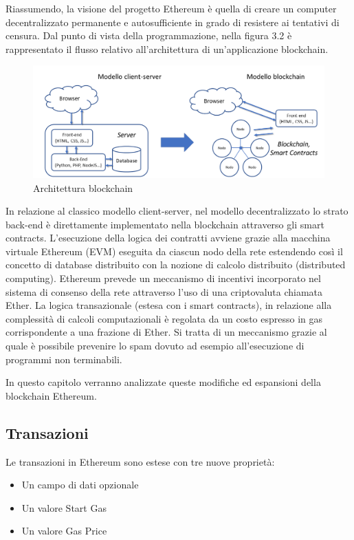 Riassumendo, la visione del progetto Ethereum è quella di creare un computer decentralizzato permanente e autosufficiente in grado di resistere ai tentativi di censura. Dal punto di vista della programmazione, nella figura 3.2 è rappresentato il flusso relativo all’architettura di un’applicazione blockchain.

\begin{figure}[H]
\centering
\includegraphics[width=1\textwidth]{immagini/architetturav1.png}
\caption{Architettura blockchain}
\label{fig:mesh8}
\end{figure}

In relazione al classico modello client-server, nel modello decentralizzato lo strato back-end è direttamente implementato nella blockchain attraverso gli smart contracts. L’esecuzione della logica dei contratti avviene grazie alla macchina virtuale Ethereum (EVM) eseguita da ciascun nodo della rete estendendo così il concetto di database distribuito con la nozione di calcolo distribuito (distributed computing). Ethereum prevede un meccanismo di incentivi incorporato nel sistema di consenso della rete attraverso l’uso di una criptovaluta chiamata Ether. La logica transazionale (estesa con i smart contracts), in relazione alla complessità di calcoli computazionali è regolata da un costo espresso in gas corrispondente a una frazione di Ether. Si tratta di un meccanismo grazie al quale è possibile prevenire lo spam dovuto ad esempio all’esecuzione di programmi non terminabili. 

In questo capitolo verranno analizzate queste modifiche ed espansioni della blockchain Ethereum.

\subsection{Transazioni}

Le transazioni in Ethereum sono estese con tre nuove proprietà:

\begin{itemize}
\item Un campo di dati opzionale
\item Un valore Start Gas
\item Un valore Gas Price
\end{itemize}

